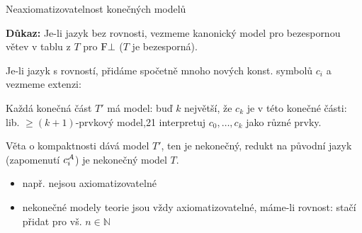 \documentclass{beamer}
\begin{document}
\begin{frame}{Neaxiomatizovatelnost konečných modelů}

    \smallskip


    \textbf{Důkaz:}
    \alert{Je-li jazyk bez rovnosti,} vezmeme  kanonický model pro bezespornou větev v tablu z $T$ pro $\mathrm{F}\bot$ ($T$ je bezesporná).
    
    \alert{Je-li jazyk s rovností,} přidáme spočetně mnoho nových konst. symbolů $c_i$ a vezmeme extenzi: 

    \vspace{-2pt}

    Každá \alert{konečná část} $T'$ má model: buď $k$ největší, že $c_k$ je v této konečné části: lib. $\geq(k+1)$-prvkový model,21 interpretuj $c_0,\dots,c_k$ jako různé prvky.

    \vspace{-2pt}

    \alert{Věta o kompaktnosti} dává model $T'$, ten je nekonečný, redukt na původní jazyk (zapomenutí $c_i^{\mathcal{A}}$) je nekonečný model $T$.\hfill\qedsymbol

    \begin{itemize}
        \item např.  nejsou axiomatizovatelné
        \item \alert{nekonečné modely} teorie jsou vždy axiomatizovatelné, máme-li rovnost: stačí přidat  pro vš. $n\in\mathbb N$
    \end{itemize}

\end{frame}
\end{document}
